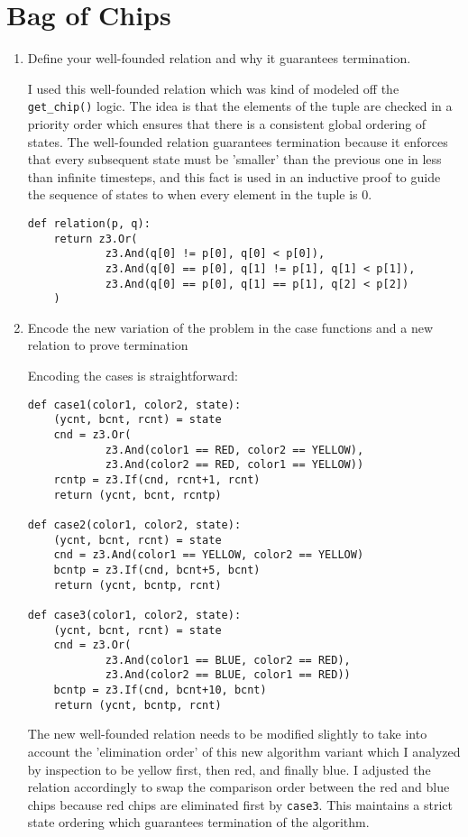 \section{Bag of Chips}
\begin{enumerate}[label=(\alph*)]
  \item {\color{blue}Define your well-founded relation and why it guarantees termination.}

    I used this well-founded relation which was kind of modeled off the \texttt{get\_chip()} logic. The idea is that the elements of the tuple are checked in a priority order which ensures that there is a consistent global ordering of states. The well-founded relation guarantees termination because it enforces that every subsequent state must be 'smaller' than the previous one in less than infinite timesteps, and this fact is used in an inductive proof to guide the sequence of states to when every element in the tuple is 0.
    \begin{verbatim}
def relation(p, q):
    return z3.Or(
            z3.And(q[0] != p[0], q[0] < p[0]),
            z3.And(q[0] == p[0], q[1] != p[1], q[1] < p[1]),
            z3.And(q[0] == p[0], q[1] == p[1], q[2] < p[2])
    )
    \end{verbatim}

  \item {\color{blue}Encode the new variation of the problem in the case functions and a new relation to prove termination}

    Encoding the cases is straightforward:
    \begin{verbatim}
def case1(color1, color2, state):
    (ycnt, bcnt, rcnt) = state
    cnd = z3.Or(
            z3.And(color1 == RED, color2 == YELLOW),
            z3.And(color2 == RED, color1 == YELLOW))
    rcntp = z3.If(cnd, rcnt+1, rcnt)
    return (ycnt, bcnt, rcntp)

def case2(color1, color2, state):
    (ycnt, bcnt, rcnt) = state
    cnd = z3.And(color1 == YELLOW, color2 == YELLOW)
    bcntp = z3.If(cnd, bcnt+5, bcnt)
    return (ycnt, bcntp, rcnt)

def case3(color1, color2, state):
    (ycnt, bcnt, rcnt) = state
    cnd = z3.Or(
            z3.And(color1 == BLUE, color2 == RED),
            z3.And(color2 == BLUE, color1 == RED))
    bcntp = z3.If(cnd, bcnt+10, bcnt)
    return (ycnt, bcntp, rcnt)
    \end{verbatim}

    The new well-founded relation needs to be modified slightly to take into account the 'elimination order' of this new algorithm variant which I analyzed by inspection to be yellow first, then red, and finally blue. I adjusted the relation accordingly to swap the comparison order between the red and blue chips because red chips are eliminated first by \texttt{case3}. This maintains a strict state ordering which guarantees termination of the algorithm.


\end{enumerate}
